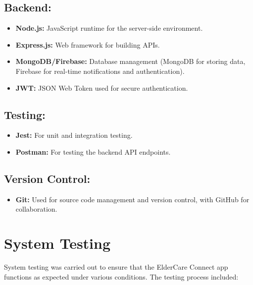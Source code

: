 \documentclass[a4paper, 12pt]{article} %
\begin{document}
\subsection*{Backend:}
\begin{itemize}
    \item \textbf{Node.js:} JavaScript runtime for the server-side environment.
    \item \textbf{Express.js:} Web framework for building APIs.
    \item \textbf{MongoDB/Firebase:} Database management (MongoDB for storing data, Firebase for real-time notifications and authentication).
    \item \textbf{JWT:} JSON Web Token used for secure authentication.
\end{itemize}

\subsection*{Testing:}
\begin{itemize}
    \item \textbf{Jest:} For unit and integration testing.
    \item \textbf{Postman:} For testing the backend API endpoints.
\end{itemize}

\subsection*{Version Control:}
\begin{itemize}
    \item \textbf{Git:} Used for source code management and version control, with GitHub for collaboration.
\end{itemize}

\section{\textbf{\LARGE System Testing}}

System testing was carried out to ensure that the ElderCare Connect app functions as expected under various conditions. The testing process included:
\end{document}
